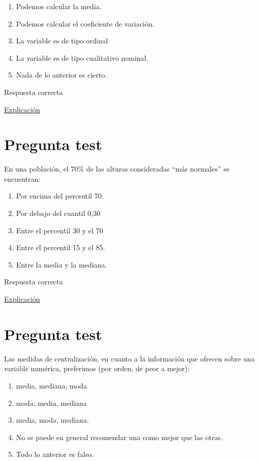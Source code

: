 \documentclass[
]{book}
\providecommand{\tightlist}{%
  \setlength{\itemsep}{0pt}\setlength{\parskip}{0pt}}
\begin{document}
\begin{enumerate}
\def\labelenumi{\alph{enumi})}
\tightlist
\item
  Podemos calcular la media.
\item
  Podemos calcular el coeficiente de variación.
\item
  La variable es de tipo ordinal
\item
  La variable es de tipo cualitativo nominal.
\item
  Nada de lo anterior es cierto.
\end{enumerate}

Respuesta correcta

\href{https://1fjmanzano.github.io/bioestadistica/tipos-de-variables.html}{Explicación}

\hypertarget{pregunta-test-74}{%
\section{Pregunta test}\label{pregunta-test-74}}

En una población, el 70\% de las alturas consideradas ``más normales'' se encuentran:

\begin{enumerate}
\def\labelenumi{\alph{enumi})}
\tightlist
\item
  Por encima del percentil 70.
\item
  Por debajo del cuantil 0,30
\item
  Entre el percentil 30 y el 70
\item
  Entre el percentil 15 y el 85.
\item
  Entre la media y la mediana.
\end{enumerate}

Respuesta correcta

\href{https://1fjmanzano.github.io/bioestadistica/distribuciones-de-probabilidad.html\#distribucio\%CC\%81n-normal}{Explicación}

\hypertarget{pregunta-test-75}{%
\section{Pregunta test}\label{pregunta-test-75}}

Las medidas de centralización, en cuanto a la información que ofrecen sobre una variable numérica, preferimos (por orden, de peor a mejor):

\begin{enumerate}
\def\labelenumi{\alph{enumi})}
\tightlist
\item
  media, mediana, moda
\item
  moda, media, mediana
\item
  media, moda, mediana.
\item
  No se puede en general recomendar una como mejor que las otras.
\item
  Todo lo anterior es falso.
\end{enumerate}
\end{document}

